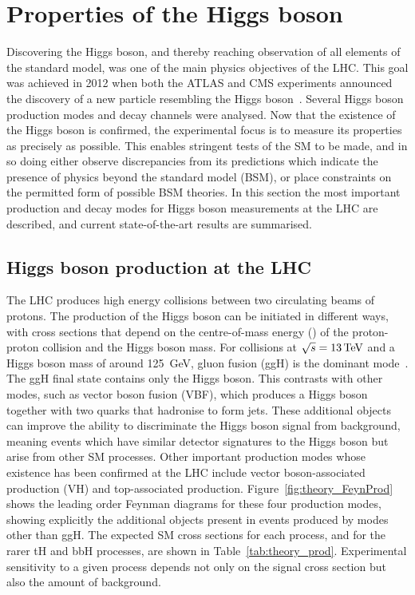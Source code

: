 \section{Properties of the Higgs boson}

Discovering the Higgs boson, and thereby reaching observation of all elements of the standard model, 
was one of the main physics objectives of the LHC. %
This goal was achieved in 2012 when both the ATLAS and CMS experiments 
announced the discovery of a new particle resembling the Higgs boson~\cite{ATLASdiscovery,CMSdiscovery}.
Several Higgs boson production modes and decay channels were analysed.
Now that the existence of the Higgs boson is confirmed, 
the experimental focus is to measure its properties as precisely as possible.
This enables stringent tests of the SM to be made, 
and in so doing either observe discrepancies from its predictions
which indicate the presence of physics beyond the standard model (BSM), 
or place constraints on the permitted form of possible BSM theories.
In this section the most important production and decay modes for Higgs boson measurements
at the LHC are described, and current state-of-the-art results are summarised.

\subsection{Higgs boson production at the LHC}

The LHC produces high energy collisions between two circulating beams of protons.
The production of the Higgs boson can be initiated in different ways, 
with cross sections that depend on the centre-of-mass energy (\sqrtS) of the proton-proton collision
and the Higgs boson mass.
For collisions at $\sqrt{s}=\SI{13}{TeV}$ and a Higgs boson mass of around \SI{125}{GeV}, 
gluon fusion (ggH) is the dominant mode~\cite{YR4}.
The ggH final state contains only the Higgs boson. 
This contrasts with other modes, such as vector boson fusion (VBF), 
which produces a Higgs boson together with two quarks that hadronise to form jets.
These additional objects can improve the ability to discriminate the Higgs boson signal 
from background, meaning events which have similar detector signatures to the Higgs boson
but arise from other SM processes.
Other important production modes whose existence has been confirmed at the LHC include 
vector boson-associated production (VH) and top-associated production.
Figure~\ref{fig:theory_FeynProd} shows the leading order Feynman diagrams 
for these four production modes, showing explicitly the additional objects present 
in events produced by modes other than ggH.
The expected SM cross sections for each process, and for the rarer tH and bbH processes, 
are shown in Table~\ref{tab:theory_prod}.
Experimental sensitivity to a given process depends not only on the signal cross section 
but also the amount of background.

